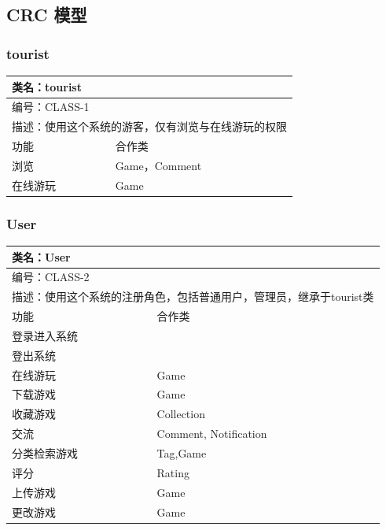 \documentclass[12pt]{ctexart} %
\begin{document}
\subsection{CRC 模型}

\subsubsection{tourist}
\begin{tabular}{|l|l|}
  \hline
  \multicolumn{2}{|l|}{类名：tourist} \\
  \hline
  \multicolumn{2}{|l|}{编号：CLASS-1} \\
  \hline
  \multicolumn{2}{|l|}{描述：使用这个系统的游客，仅有浏览与在线游玩的权限} \\
  \hline
  功能 & 合作类 \\
  \hline
  浏览 & Game，Comment\\
  \hline
  在线游玩 & Game\\
  \hline
  \end{tabular}

\subsubsection{User}
\begin{tabular}{|l|l|}
  \hline
  \multicolumn{2}{|l|}{类名：User} \\
  \hline
  \multicolumn{2}{|l|}{编号：CLASS-2} \\
  \hline
  \multicolumn{2}{|l|}{描述：使用这个系统的注册角色，包括普通用户，管理员，继承于tourist类} \\
  \hline
  功能 & 合作类 \\
  \hline
  登录进入系统 & \\
  \hline
  登出系统 & \\
  \hline
  在线游玩 & Game \\
  \hline
  下载游戏 & Game \\
  \hline
  收藏游戏 & Collection \\
  \hline
  交流 & Comment, Notification \\
  \hline
  分类检索游戏 & Tag,Game \\
  \hline
  评分 & Rating \\
  \hline
  上传游戏 & Game\\
  \hline
  更改游戏 & Game\\
  \hline
  \end{tabular}
\end{document}
